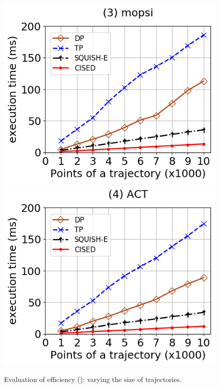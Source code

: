 \begin{figure}[tb!]
	\includegraphics[scale=0.315]{Figures/Exp-SED-time-size-mopsi.png}	\hspace{1ex}
	\includegraphics[scale=0.315]{Figures/Exp-SED-time-size-zh.png}	\hspace{1ex}
	\vspace{-2.5ex}
	\caption{\small Evaluation of efficiency (\sed): varying the size of trajectories.}\label{fig:time-size-sed}
	\vspace{-3ex}
\end{figure}




